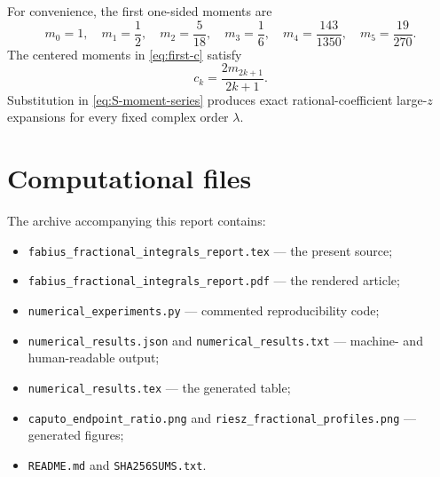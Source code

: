 \documentclass[11pt,oneside]{article}
\numberwithin{equation}{section}
\theoremstyle{plain}
\theoremstyle{definition}
\theoremstyle{remark}
\begin{document}
For convenience, the first one-sided moments are
\begin{equation}
 m_0=1,
 \quad m_1=\frac12,
 \quad m_2=\frac5{18},
 \quad m_3=\frac16,
 \quad m_4=\frac{143}{1350},
 \quad m_5=\frac{19}{270}.
 \label{eq:low-moments-appendix}
\end{equation}
The centered moments in \cref{eq:first-c} satisfy
\begin{equation}
 c_k=\frac{2m_{2k+1}}{2k+1}.
 \label{eq:c-m-relation}
\end{equation}
Substitution in \cref{eq:S-moment-series} produces exact rational-coefficient
large-$z$ expansions for every fixed complex order $\lambda$.

\section{Computational files}

The archive accompanying this report contains:
\begin{itemize}
\item \texttt{fabius\_fractional\_integrals\_report.tex} --- the present source;
\item \texttt{fabius\_fractional\_integrals\_report.pdf} --- the rendered article;
\item \texttt{numerical\_experiments.py} --- commented reproducibility code;
\item \texttt{numerical\_results.json} and
      \texttt{numerical\_results.txt} --- machine- and human-readable output;
\item \texttt{numerical\_results.tex} --- the generated table;
\item \texttt{caputo\_endpoint\_ratio.png} and
      \texttt{riesz\_fractional\_profiles.png} --- generated figures;
\item \texttt{README.md} and \texttt{SHA256SUMS.txt}.
\end{itemize}
\end{document}
